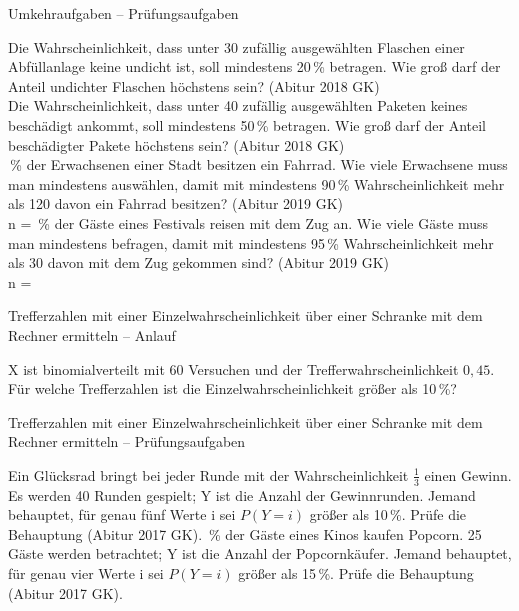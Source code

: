 \begin{aufgabe}{Umkehraufgaben – Prüfungsaufgaben}
\begin{teile}
\teil Die Wahrscheinlichkeit, dass unter 30 zufällig ausgewählten Flaschen einer Abfüllanlage keine undicht ist, soll mindestens 20\,\% betragen. Wie groß darf der Anteil undichter Flaschen höchstens sein? \hfill (Abitur 2018 GK) \\ \leerfeld
\teil Die Wahrscheinlichkeit, dass unter 40 zufällig ausgewählten Paketen keines beschädigt ankommt, soll mindestens 50\,\% betragen. Wie groß darf der Anteil beschädigter Pakete höchstens sein? \hfill (Abitur 2018 GK) \\ \leerfeld
{}\,\% der Erwachsenen einer Stadt besitzen ein Fahrrad. Wie viele Erwachsene muss man mindestens auswählen, damit mit mindestens 90\,\% Wahrscheinlichkeit mehr als 120 davon ein Fahrrad besitzen? \hfill (Abitur 2019 GK) \\ n = \leerfeld
{}\,\% der Gäste eines Festivals reisen mit dem Zug an. Wie viele Gäste muss man mindestens befragen, damit mit mindestens 95\,\% Wahrscheinlichkeit mehr als 30 davon mit dem Zug gekommen sind? \hfill (Abitur 2019 GK) \\ n = \leerfeld
\end{teile}
\end{aufgabe}

\begin{aufgabe}{Trefferzahlen mit einer Einzelwahrscheinlichkeit über einer Schranke mit dem Rechner ermitteln – Anlauf}
\begin{teile}
\teil X ist binomialverteilt mit 60 Versuchen und der Trefferwahrscheinlichkeit $0{,}45$. Für welche Trefferzahlen ist die Einzelwahrscheinlichkeit größer als 10\,\%?
\end{teile}
\end{aufgabe}

\begin{aufgabe}{Trefferzahlen mit einer Einzelwahrscheinlichkeit über einer Schranke mit dem Rechner ermitteln – Prüfungsaufgaben}
\begin{teile}
\teil Ein Glücksrad bringt bei jeder Runde mit der Wahrscheinlichkeit $\frac{1}{3}$ einen Gewinn. Es werden 40 Runden gespielt; Y ist die Anzahl der Gewinnrunden. Jemand behauptet, für genau fünf Werte i sei $P(Y = i)$ größer als 10\,\%. Prüfe die Behauptung \hfill (Abitur 2017 GK).
\,\% der Gäste eines Kinos kaufen Popcorn. 25 Gäste werden betrachtet; Y ist die Anzahl der Popcornkäufer. Jemand behauptet, für genau vier Werte i sei $P(Y = i)$ größer als 15\,\%. Prüfe die Behauptung \hfill (Abitur 2017 GK).
\end{teile}
\end{aufgabe}

